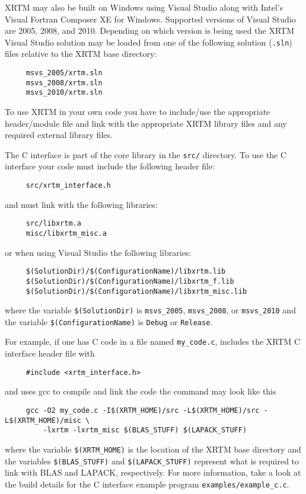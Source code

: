 \label{building_and_using_xrtm_building_xrtm_visual_studio}

XRTM may also be built on Windows using Visual Studio along with Intel's Visual Fortran Composer XE for Windows.  Supported versions of Visual Studio are 2005, 2008, and 2010.   Depending on which version is being used the XRTM Visual Studio solution may be loaded from one of the following solution (\texttt{.sln}) files relative to the XRTM base directory:
\begin{verbatim}
     msvs_2005/xrtm.sln
     msvs_2008/xrtm.sln
     msvs_2010/xrtm.sln
\end{verbatim}


\label{building_and_using_xrtm_using_xrtm_in_your_code}

To use XRTM in your own code you have to include/use the appropriate header/module file and link with the appropriate XRTM library files and any required external library files.


\label{building_and_using_xrtm_using_xrtm_in_your_code_c}

The C interface is part of the core library in the \texttt{src/} directory.  To use the C interface your code must include the following header file:
\begin{verbatim}
     src/xrtm_interface.h
\end{verbatim}
and must link with the following libraries:
\begin{verbatim}
     src/libxrtm.a
     misc/libxrtm_misc.a
\end{verbatim}
or when using Visual Studio the following libraries:
\begin{verbatim}
     $(SolutionDir)/$(ConfigurationName)/libxrtm.lib
     $(SolutionDir)/$(ConfigurationName)/libxrtm_f.lib
     $(SolutionDir)/$(ConfigurationName)/libxrtm_misc.lib
\end{verbatim}
where the variable \texttt{\$(SolutionDir)} is \texttt{msvs\_2005}, \texttt{msvs\_2008}, or \texttt{msvs\_2010} and the variable \texttt{\$(ConfigurationName)} is \texttt{Debug} or \texttt{Release}.

For example, if one has C code in a file named \texttt{my\_code.c}, includes the XRTM C interface header file with
\begin{verbatim}
     #include <xrtm_interface.h>
\end{verbatim}
and uses gcc to compile and link the code the command may look like this
\begin{verbatim}
     gcc -O2 my_code.c -I$(XRTM_HOME)/src -L$(XRTM_HOME)/src -L$(XRTM_HOME)/misc \
         -lxrtm -lxrtm_misc $(BLAS_STUFF) $(LAPACK_STUFF)
\end{verbatim}
where the variable \texttt{\$(XRTM\_HOME)} is the location of the XRTM base directory and the variables \texttt{\$(BLAS\_STUFF)} and \texttt{\$(LAPACK\_STUFF)} represent what is required to link with BLAS and LAPACK, respectively.  For more information, take a look at the build details for the C interface example program \texttt{examples/example\_c.c}.


